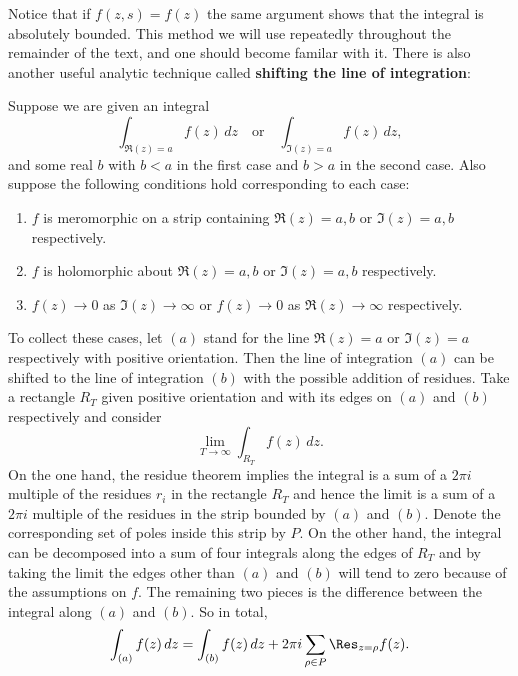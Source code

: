         Notice that if $f(z,s) = f(z)$ the same argument shows that the integral is absolutely bounded. This method we will use repeatedly throughout the remainder of the text, and one should become familar with it. There is also another useful analytic technique called \textbf{shifting the line of integration}:

        \begin{method}
            Suppose we are given an integral
            \[
              \int_{\Re(z) = a}f(z)\,dz \quad \text{or} \quad \int_{\Im(z) = a}f(z)\,dz,
            \]
            and some real $b$ with $b < a$ in the first case and $b > a$ in the second case. Also suppose the following conditions hold corresponding to each case:
            \begin{enumerate}[label=(\roman*)]
              \item $f$ is meromorphic on a strip containing $\Re(z) = a,b$ or $\Im(z) = a,b$ respectively.
              \item $f$ is holomorphic about $\Re(z) = a,b$ or $\Im(z) = a,b$ respectively.
              \item $f(z) \to 0$ as $\Im(z) \to \infty$ or $f(z) \to 0$ as $\Re(z) \to \infty$ respectively.
            \end{enumerate}
            To collect these cases, let $(a)$ stand for the line $\Re(z) = a$ or $\Im(z) = a$ respectively with positive orientation. Then the line of integration $(a)$ can be shifted to the line of integration $(b)$ with the possible addition of residues. Take a rectangle $R_{T}$ given positive orientation and with its edges on $(a)$ and $(b)$ respectively and consider
            \[
              \lim_{T \to \infty}\int_{R_{T}}f(z)\,dz.
            \]
            On the one hand, the residue theorem implies the integral is a sum of a $2\pi i$ multiple of the residues $r_{i}$ in the rectangle $R_{T}$ and hence the limit is a sum of a $2\pi i$ multiple of the residues in the strip bounded by $(a)$ and $(b)$. Denote the corresponding set of poles inside this strip by $P$. On the other hand, the integral can be decomposed into a sum of four integrals along the edges of $R_{T}$ and by taking the limit the edges other than $(a)$ and $(b)$ will tend to zero because of the assumptions on $f$. The remaining two pieces is the difference between the integral along $(a)$ and $(b)$. So in total,
            \[
              \int_{(a)}f(z)\,dz = \int_{(b)}f(z)\,dz+2\pi i\sum_{\rho \in P}\Res_{z = \rho}f(z).
            \]
        \end{method}

